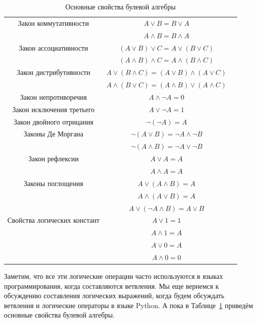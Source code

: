 \begin{table}[!ht]
\centering
\begin{tabular}{|c|c|c|}
\hline
Закон коммутативности     & $A \vee B = B \vee A$ \\
                          & $A \wedge B = B \wedge A$ \\\hline
Закон ассоциативности     & $(A \vee B) \vee C = A \vee (B \vee C)$ \\
                          & $(A \wedge B) \wedge C = A \wedge (B \wedge C)$ \\\hline
Закон дистрибутивности    & $A \vee (B \wedge C) = (A \vee B) \wedge (A \vee C)$ \\
                          & $A \wedge (B \vee C) = (A \wedge B) \vee (A \wedge C)$ \\\hline
Закон непротиворечия      & $A \wedge \lnot A = 0$ \\\hline
Закон исключения третьего & $A \vee \lnot A = 1$ \\\hline
Закон двойного отрицания  & $\lnot(\lnot A) = A$ \\\hline
Законы Де Моргана         & $\lnot (A \vee B) = \lnot A \wedge \lnot B$ \\
                          & $\lnot (A \wedge B) = \lnot A \vee \lnot B$ \\\hline
Закон рефлексии           & $A \vee A = A$ \\
                          & $A \wedge A = A$ \\\hline
Законы поглощения         & $A \vee (A \wedge B) = A$ \\
                          & $A \wedge (A \vee B) = A$ \\
                          & $A \vee (\lnot A \wedge B) = A \vee B$ \\\hline
Свойства логических констант & $A \vee 1 = 1$ \\
                             & $A \wedge 1 = A$ \\
                             & $A \vee 0 = A$ \\
                             & $A \wedge 0 = 0$ \\\hline
\end{tabular}
\caption{Основные свойства булевой алгебры}
\label{tab:logic:properties}
\end{table}

Заметим, что все эти логические операции часто используются в языках 
программирования, когда составляются ветвления. Мы еще вернемся 
к обсуждению составления логических выражений, когда будем обсуждать
ветвления и логические операторы в языке Python. А пока в 
Таблице~\ref{tab:logic:properties} приведём основные свойства булевой
алгебры.

